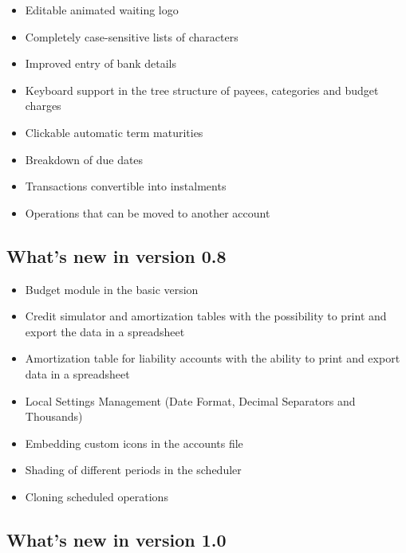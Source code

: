 \begin{itemize}
	\item Editable animated waiting logo
	\item Completely case-sensitive lists of characters
	\item Improved entry of bank details
	\item Keyboard support in the tree structure of payees, categories and budget charges
	\item Clickable automatic term maturities
	\item Breakdown of due dates
	\item Transactions convertible into instalments
	\item Operations that can be moved to another account
\end{itemize}

\subsection{What's new in version 0.8}

\begin{itemize}%
	\item Budget module in the basic version
	\item Credit simulator and amortization tables with the possibility to print and export the data in a spreadsheet
	\item Amortization table for liability accounts with the ability to print and export data in a spreadsheet
	\item Local Settings Management (Date Format, Decimal Separators and Thousands)
	\item Embedding custom icons in the accounts file
	\item Shading of different periods in the scheduler
	\item Cloning scheduled operations
\end{itemize}


\newpage

\subsection{What's new in version 1.0}

